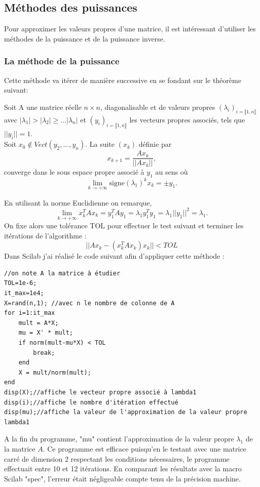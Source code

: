       \subsection{Méthodes des puissances}
      Pour approximer les valeurs propres d'une matrice, il est intéressant d'utiliser les méthodes de la puissance et de la puissance inverse.
      \subsubsection{La méthode de la puissance}
      Cette méthode va itérer de manière successive en se fondant sur le théorème suivant:
      \begin{theoreme}
      Soit A une matrice réelle $n\times n$, diagonalisable et de valeurs propres $(\lambda_i)_{i=\llbracket1,n\rrbracket}$ avec $|\lambda_1|>|\lambda_2|\geq...|\lambda_n|$ et $(y_i)_{i=\llbracket1,n\rrbracket}$ les vecteurs propres associés, tels que $||y_i||=1$.\\
      Soit $x_0\notin Vect(y_2,...,y_n).$ La suite $(x_k)$ définie par $$x_{k+1}=\frac{Ax_k}{||Ax_k||},$$
      converge dans le sous espace propre associé à $y_1$ au sens où
      $$\lim\limits_{k\to +\infty}\text{signe}(\lambda_1)^kx_k=\pm y_1.$$
      \end{theoreme}
      En utilisant la norme Euclidienne on remarque,
      $$
      \lim\limits_{k\to +\infty} x_k^TAx_k=y_1^TAy_1=\lambda_1y_1^Ty_1=\lambda_1||y_1||^2=\lambda_1.
      $$
      On fixe alors une tolérance TOL pour effectuer le test suivant et terminer les itérations de l'algorithme :
      $$
      ||Ax_k-(x_k^TAx_k)x_k||<TOL
      $$
      Dans Scilab j'ai réalisé le code suivant afin d'appliquer cette méthode :
      \begin{center}
          \begin{verbatim}
//on note A la matrice à étudier
TOL=1e-6;
it_max=1e4;
X=rand(n,1); //avec n le nombre de colonne de A
for i=1:it_max
    mult = A*X;
    mu = X' * mult;
    if norm(mult-mu*X) < TOL
        break;
    end
    X = mult/norm(mult);
end
disp(X);//affiche le vecteur propre associé à lambda1
disp(i);//affiche le nombre d'itération effectué
disp(mu);//affiche la valeur de l'approximation de la valeur propre lambda1
          \end{verbatim}
                \label{lst:code_18}
         \end{center}
         A la fin du programme, "mu" contient l'approximation de la valeur propre $\lambda_1$ de la matrice $A$. Ce programme est efficace puisqu'en le testant avec une matrice carré de dimension 2 respectant les conditions nécessaires, le programme effectuait entre 10 et 12 itérations. En comparant les résultats avec la macro Scilab "spec", l'erreur était négligeable compte tenu de la précision machine.
